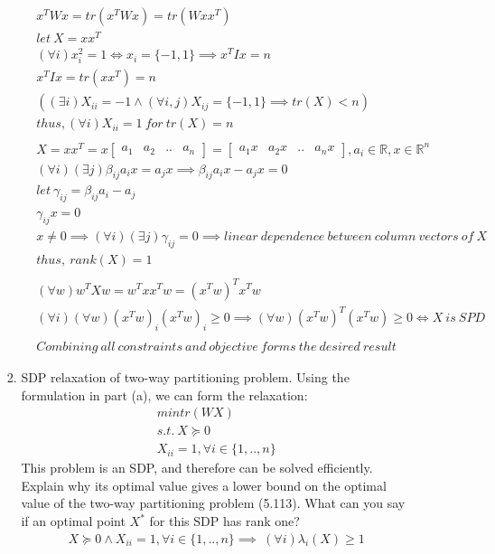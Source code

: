 \documentclass[12pt,letter]{article}
\newcommand{\R}{\mathbb{R}}
\begin{document}
\begin{enumerate}
\begin{enumerate}
\begin{enumerate}
    \begin{align*}
      &x^T W x = tr(x^T W x)=tr(Wxx^T)\\
      &let\ X=xx^T\\
      &(\forall i) x_i^2 = 1 \iff x_i = \{-1,1\} \implies x^TIx = n\\
      &x^TIx = tr(xx^T)=n\\
      &((\exists i)X_{ii}=-1 \wedge (\forall i,j) X_{ij} = \{-1,1\} \implies tr(X) < n)\\
      &thus, (\forall i)X_{ii}=1\ for\ tr(X)=n\\
      \\
      &X=xx^T=x
      \begin{bmatrix}
        a_1 & a_2 & .. & a_n
      \end{bmatrix} =
                         \begin{bmatrix}
                           a_1 x & a_2 x & .. & a_n x
                         \end{bmatrix}, a_i \in \R, x \in \R^n\\
      &(\forall i)(\exists j) \beta_{ij} a_i x = a_j x \implies \beta_{ij} a_i x - a_j x = 0\\
      &let\ \gamma_{ij} = \beta_{ij} a_i - a_j\\
      &\gamma_{ij} x = 0\\
      &x\not=0 \implies (\forall i)(\exists j) \gamma_{ij} = 0 \implies linear\ dependence\ between\ column\ vectors\ of\ X\\
      &thus,\ rank(X)=1\\
      \\
      &(\forall w) w^TXw = w^Txx^Tw = (x^Tw)^T x^Tw\\
      &(\forall i)(\forall w)(x^Tw)_i (x^Tw)_i \geq 0 \implies (\forall w)(x^Tw)^T (x^Tw) \geq 0 \iff X\ is\ SPD\\
      \\
      &Combining\ all\ constraints\ and\ objective\ forms\ the\ desired\ result
    \end{align*}
    \pagebreak
  \item
    SDP relaxation of two-way partitioning problem. Using the formulation in part (a), we can form the relaxation:
    \begin{align*}
      min tr(W X)\\
      s.t.\ X \succeq 0\\
      X_{ii} = 1, \forall i \in \{1,..,n\}
    \end{align*}
    This problem is an SDP, and therefore can be solved efficiently. Explain why its optimal value gives a lower bound on the optimal value of the two-way partitioning problem (5.113). What can you say if an optimal point $X^*$ for this SDP has rank one?
    \begin{align*}
      X \succeq 0 \wedge X_{ii} = 1, \forall i \in \{1,..,n\} \implies\ (\forall i) \lambda_i(X) \geq 1\\
      

\end{align*}
\end{enumerate}
\end{enumerate}
\end{enumerate}
\end{document}
